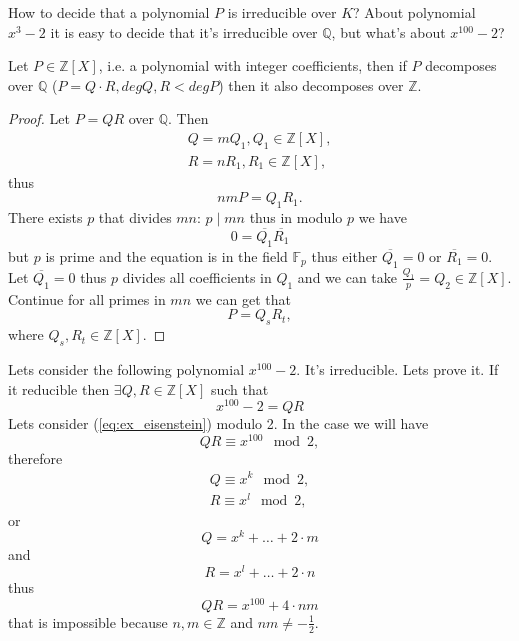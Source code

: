 How to decide that a polynomial $P$ is irreducible over $K$?
About polynomial $x^3 - 2$ it is easy to decide that it's irreducible
over $\mathbb{Q}$, but what's about $x^{100}-2$?

\begin{lemma}[Gauss]
  Let $P \in \mathbb{Z}\left[X\right]$, i.e. a polynomial with integer
  coefficients, then if $P$ decomposes over $\mathbb{Q}$ ($P = Q\cdot
  R, deg Q,R < deg P$) then it also decomposes over $\mathbb{Z}$.
  \begin{proof}
    Let $P = Q R$ over $\mathbb{Q}$. Then
    \begin{eqnarray}
      Q = m Q_1, Q_1 \in \mathbb{Z}\left[X\right],
      \nonumber \\
      R = n R_1, R_1 \in \mathbb{Z}\left[X\right],
      \nonumber
    \end{eqnarray}
    thus
    \[
    n m P = Q_1 R_1. 
    \]
    There exists $p$ that divides $mn$: $p \mid mn$ thus in modulo $p$
    we have
    \[
    0 = \overline{Q_1}\overline{R_1}
    \]
    but $p$ is prime and the equation is in the field $\mathbb{F}_p$
    thus either $\overline{Q_1} = 0$ or $\overline{R_1} = 0$. Let
    $\overline{Q_1} = 0$ thus $p$ divides all coefficients in $Q_1$
    and we can take $\frac{Q_1}{p} = Q_2 \in
    \mathbb{Z}\left[X\right]$. Continue for all primes in $mn$ we can
    get that
    \[
    P = Q_s R_t,
    \]
    where $Q_s, R_t \in \mathbb{Z}\left[X\right]$.
  \end{proof}
  \label{lem:gauss}
\end{lemma}

\begin{example}
  Lets consider the following polynomial $x^{100} -2$. It's
  irreducible. Lets prove it. If it reducible then
  $\exists Q, R \in \mathbb{Z}\left[X\right]$ such that
  \begin{equation}
    x^{100} -2 = Q R
    \label{eq:ex_eisenstein}
  \end{equation}
  Lets consider (\ref{eq:ex_eisenstein}) modulo 2. In the case we will
  have
  \[
  Q R \equiv x^{100} \mod 2,
  \]
  therefore
  \begin{eqnarray}
    Q \equiv x^k \mod 2,
    \nonumber \\
    R \equiv x^l \mod 2,
    \nonumber
  \end{eqnarray}
  or
  \[
  Q = x^k + \dots + 2 \cdot m
  \]
  and
  \[
  R = x^l + \dots + 2 \cdot n
  \]
  thus
  \[
  QR = x^{100} + 4 \cdot nm
  \]
  that is impossible because $n,m \in \mathbb{Z}$ and $nm \ne
  -\frac{1}{2}$. 
  \label{ex:eisenstein}
\end{example}

